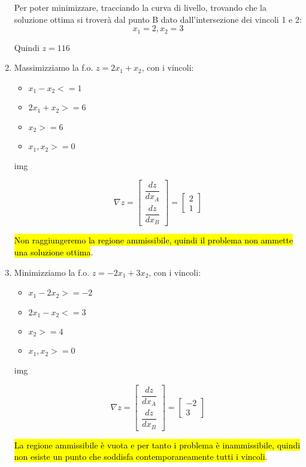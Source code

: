 \begin{enumerate}
		Per poter minimizzare, tracciando la curva di livello, trovando che la soluzione ottima si troverà dal punto B dato dall'intersezione dei vincoli 1 e 2:
		$$x_1 = 2, x_2 = 3$$
		
		Quindi $z= 116$
		
	\item Massimizziamo la f.o. $z = 2x_1 + x_2$, con i vincoli:
		\begin{itemize}
			\item $x_1 - x_2 <= 1$
			\item $2x_1 + x_2 >= 6$
			\item $x_2 >= 6$
			\item $x_1, x_2 >= 0$
		\end{itemize}
		
		img
		
		$$\nabla z = \left[\begin{array}{c}
			\dfrac{dz}{dx_A}\\
			\dfrac{dz}{dx_B}
		\end{array}\right] = \left[\begin{array}{c}
			2\\
			1
		\end{array}\right]
		$$
		
		\hl{Non raggiungeremo la regione ammissibile, quindi il problema non ammette una soluzione ottima}.
		
	\item Minimizziamo la f.o. $z = -2x_1 + 3x_2$, con i vincoli:
		\begin{itemize}
			\item $x_1 - 2x_2 >= -2$
			\item $2x_1 - x_2 <= 3$
			\item $x_2 >= 4$
			\item $x_1, x_2 >= 0$
		\end{itemize}
		
		img
		
		$$\nabla z = \left[\begin{array}{c}
			\dfrac{dz}{dx_A}\\
			\dfrac{dz}{dx_B}
		\end{array}\right] = \left[\begin{array}{c}
			-2\\
			3
		\end{array}\right]
		$$
		
		\hl{La regione ammissibile è vuota e per tanto i problema è inammissibile, quindi non esiste un punto che soddisfa contemporaneamente tutti i vincoli}.
		

\end{enumerate}
